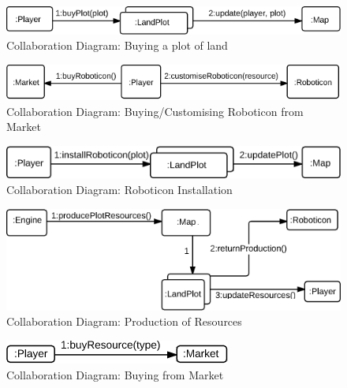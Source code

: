 \begin{figure}[p]
	\begin{centering}
		\includegraphics[width=\textwidth]{figures/collab1.png}
		\caption{Collaboration Diagram: Buying a plot of land}
		\label{fig:collab1}
	\end{centering}
\end{figure}
\begin{figure}[p]
	\begin{centering}
		\includegraphics[width=\textwidth]{figures/collab2.png}
		\caption{Collaboration Diagram: Buying/Customising Roboticon from Market}
		\label{fig:collab2}
	\end{centering}
\end{figure}
\begin{figure}[p]
	\begin{centering}
		\includegraphics[width=\textwidth]{figures/collab3.png}
		\caption{Collaboration Diagram: Roboticon Installation}
		\label{fig:collab3}
	\end{centering}
\end{figure}
\begin{figure}[p]
	\begin{centering}
		\includegraphics[width=\textwidth]{figures/collab4.png}
		\caption{Collaboration Diagram: Production of Resources}
		\label{fig:collab4}
	\end{centering}
\end{figure}
\begin{figure}[p]
	\begin{centering}
		\includegraphics[]{figures/collab5.png}
		\caption{Collaboration Diagram: Buying from Market}
		\label{fig:collab5}
	\end{centering}
\end{figure}
